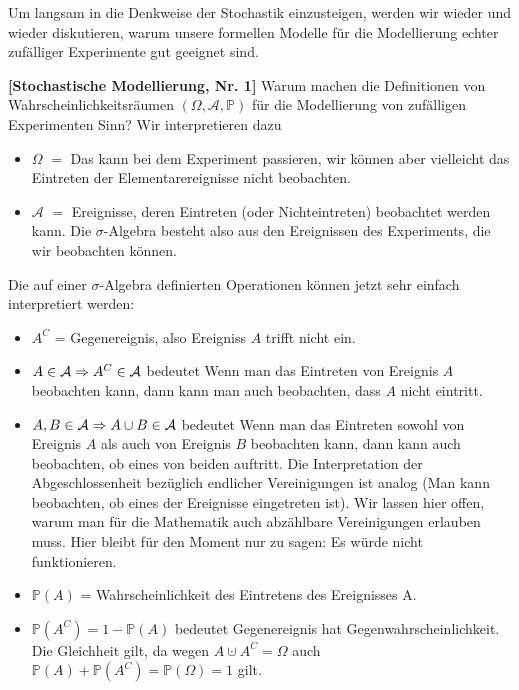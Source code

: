 Um langsam in die Denkweise der Stochastik einzusteigen, werden wir wieder und wieder diskutieren, warum unsere formellen Modelle f\"ur die Modellierung echter zuf\"alliger Experimente gut geeignet sind. 

\begin{disc} \label{N1} \textbf{[Stochastische Modellierung, Nr. 1]}
	Warum machen die Definitionen von Wahrscheinlichkeitsräumen $(\Omega, \mathcal A, \mathbb P)$ für die Modellierung von zufälligen Experimenten Sinn? Wir interpretieren dazu
	\begin{laufmerksamkeit}
	\begin{itemize}
		\item $\Omega$ $=$ \glqq Das kann bei dem Experiment passieren\grqq, wir k\"onnen aber vielleicht das Eintreten der Elementarereignisse nicht beobachten.
		\item $\mathcal A$ $=$ \glqq Ereignisse, deren Eintreten (oder Nichteintreten) beobachtet werden kann.\grqq{} Die $\sigma$-Algebra besteht also aus den Ereignissen des Experiments, die wir beobachten k\"onnen.
	\end{itemize}
\end{laufmerksamkeit}
Die auf einer $\sigma$-Algebra definierten Operationen k\"onnen jetzt sehr einfach interpretiert werden:
	\begin{itemize}
		\item $A^C$ = \glqq Gegenereignis\grqq, also \glqq Ereigniss $A$ trifft nicht ein\grqq.
		\item $A \in \mathcal{A} \Rightarrow A^{C} \in \mathcal{A}$ bedeutet \glqq Wenn man das Eintreten von Ereignis $A$ beobachten kann, dann kann man auch beobachten, dass $A$ nicht eintritt.\grqq		
		\item $A, B\in \mathcal{A} \Rightarrow A\cup B\in \mathcal{A}$ bedeutet \glqq Wenn man das Eintreten  sowohl von Ereignis $A$ als auch von Ereignis $B$ beobachten kann, dann kann auch beobachten, ob eines von beiden auftritt.\grqq{} Die Interpretation der Abgeschlossenheit bez\"uglich endlicher Vereinigungen ist analog (\glqq Man kann beobachten, ob eines der Ereignisse eingetreten ist\grqq). Wir lassen hier offen, warum man f\"ur die Mathematik auch abz\"ahlbare Vereinigungen erlauben muss. Hier bleibt f\"ur den Moment nur zu sagen: Es w\"urde nicht funktionieren.
				\item $\mathbb P(A)$ = \glqq Wahrscheinlichkeit des Eintretens des Ereignisses A.\grqq
		\item $\mathbb P(A^C) = 1-\mathbb P(A)$ bedeutet \glqq Gegenereignis hat Gegenwahrscheinlichkeit.\grqq{} Die Gleichheit gilt, da wegen $A\cupdot A^C=\Omega$ auch $\mathbb P(A)+\mathbb P(A^C)=\mathbb P(\Omega)=1$ gilt.

\end{itemize}
\end{disc}
